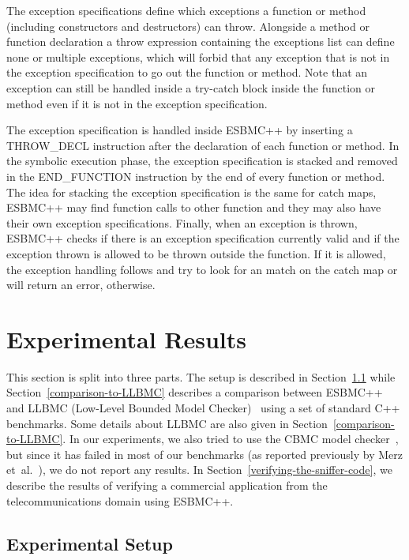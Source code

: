 \documentclass[conference]{IEEEtran}
\begin{document}
The exception specifications define which exceptions a
function or method (including constructors
and destructors) can throw. Alongside a method or
function declaration a throw expression containing
the exceptions list can define none or
multiple exceptions, which will forbid that
any exception that is not in the exception
specification to go out the function or method. Note
that an exception can still be handled inside
a try-catch block inside the function or method
even if it is not in the exception specification.

The exception specification is handled inside ESBMC++
by inserting a THROW\_DECL instruction after the declaration
of each function or method. In the symbolic execution phase,
the exception specification is stacked and removed in the
END\_FUNCTION instruction by the end of every
function or method. The idea for stacking the exception
specification is the same for catch maps, ESBMC++ may
find function calls to other
function and they may also have their own exception specifications.
Finally, when an exception is thrown, ESBMC++ checks if there is an
exception specification currently valid and if the exception thrown
is allowed to be thrown outside the function. If it is allowed, the
exception handling follows and try to look for an match on the catch
map or will return an error, otherwise.


\section{Experimental Results}
\label{experimental-results}

This section is split into three parts.
The setup is described in Section~\ref{experimental-setup}
while Section~\ref{comparison-to-LLBMC} describes a comparison
between ESBMC++~\cite{esbmc12} and
LLBMC (Low-Level Bounded Model Checker)~\cite{llbmc12}
using a set of standard C++ benchmarks. Some details about LLBMC
are also given in Section~\ref{comparison-to-LLBMC}.
In our experiments, we also tried to use the CBMC model checker~\cite{Clarke04},
but since it has failed in most of our benchmarks (as reported previously
by Merz et~al.~\cite{Florian12}), we do not report any results.
In Section~\ref{verifying-the-sniffer-code}, we describe the results of
verifying a commercial application from the telecommunications domain using ESBMC++.

\subsection{Experimental Setup}
\label{experimental-setup}
\end{document}

